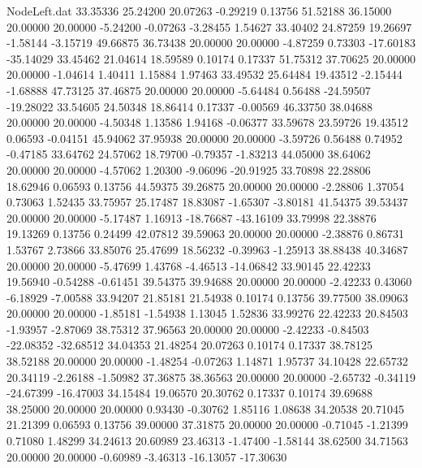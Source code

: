 \begin{filecontents}{NodeLeft.dat}
  33.35336   25.24200   20.07263    -0.29219    0.13756   51.52188   36.15000   20.00000   20.00000   -5.24200   -0.07263   -3.28455    1.54627
  33.40402   24.87259   19.26697    -1.58144   -3.15719   49.66875   36.73438   20.00000   20.00000   -4.87259    0.73303  -17.60183  -35.14029
  33.45462   21.04614   18.59589     0.10174    0.17337   51.75312   37.70625   20.00000   20.00000   -1.04614    1.40411    1.15884    1.97463
  33.49532   25.64484   19.43512    -2.15444   -1.68888   47.73125   37.46875   20.00000   20.00000   -5.64484    0.56488  -24.59507  -19.28022
  33.54605   24.50348   18.86414     0.17337   -0.00569   46.33750   38.04688   20.00000   20.00000   -4.50348    1.13586    1.94168   -0.06377
  33.59678   23.59726   19.43512     0.06593   -0.04151   45.94062   37.95938   20.00000   20.00000   -3.59726    0.56488    0.74952   -0.47185
  33.64762   24.57062   18.79700    -0.79357   -1.83213   44.05000   38.64062   20.00000   20.00000   -4.57062    1.20300   -9.06096  -20.91925
  33.70898   22.28806   18.62946     0.06593    0.13756   44.59375   39.26875   20.00000   20.00000   -2.28806    1.37054    0.73063    1.52435
  33.75957   25.17487   18.83087    -1.65307   -3.80181   41.54375   39.53437   20.00000   20.00000   -5.17487    1.16913  -18.76687  -43.16109
  33.79998   22.38876   19.13269     0.13756    0.24499   42.07812   39.59063   20.00000   20.00000   -2.38876    0.86731    1.53767    2.73866
  33.85076   25.47699   18.56232    -0.39963   -1.25913   38.88438   40.34687   20.00000   20.00000   -5.47699    1.43768   -4.46513  -14.06842
  33.90145   22.42233   19.56940    -0.54288   -0.61451   39.54375   39.94688   20.00000   20.00000   -2.42233    0.43060   -6.18929   -7.00588
  33.94207   21.85181   21.54938     0.10174    0.13756   39.77500   38.09063   20.00000   20.00000   -1.85181   -1.54938    1.13045    1.52836
  33.99276   22.42233   20.84503    -1.93957   -2.87069   38.75312   37.96563   20.00000   20.00000   -2.42233   -0.84503  -22.08352  -32.68512
  34.04353   21.48254   20.07263     0.10174    0.17337   38.78125   38.52188   20.00000   20.00000   -1.48254   -0.07263    1.14871    1.95737
  34.10428   22.65732   20.34119    -2.26188   -1.50982   37.36875   38.36563   20.00000   20.00000   -2.65732   -0.34119  -24.67399  -16.47003
  34.15484   19.06570   20.30762     0.17337    0.10174   39.69688   38.25000   20.00000   20.00000    0.93430   -0.30762    1.85116    1.08638
  34.20538   20.71045   21.21399     0.06593    0.13756   39.00000   37.31875   20.00000   20.00000   -0.71045   -1.21399    0.71080    1.48299
  34.24613   20.60989   23.46313    -1.47400   -1.58144   38.62500   34.71563   20.00000   20.00000   -0.60989   -3.46313  -16.13057  -17.30630

\end{filecontents}
